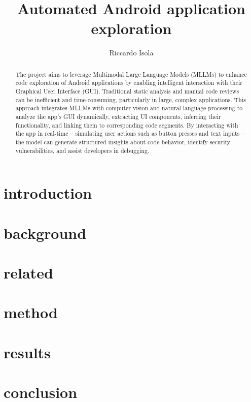 \documentclass{masterthesis}
\begin{document}
\title{Automated Android application exploration}

\author{Riccardo Isola}



\maketitle

\begin{abstract}
The project aims to leverage Multimodal Large Language Models (MLLMs) to
enhance code exploration of Android applications by enabling intelligent
interaction with their Graphical User Interface (GUI). Traditional
static analysis and manual code reviews can be inefficient and
time-consuming, particularly in large, complex applications. This
approach integrates MLLMs with computer vision and natural language
processing to analyze the app's GUI dynamically, extracting UI
components, inferring their functionality, and linking them to
corresponding code segments. By interacting with the app in real-time --
simulating user actions such as button presses and text inputs -- the
model can generate structured insights about code behavior, identify
security vulnerabilities, and assist developers in debugging.
\end{abstract}

\tableofcontents


\chapter{introduction}
\label{sec:introduction}



\chapter{background}
\label{sec:background}



\chapter{related}
\label{sec:related}



\chapter{method}
\label{sec:method}



\chapter{results}
\label{sec:results}



\chapter{conclusion}
\label{sec:conclusion}



\printbibliography
% 
% 
\end{document}
